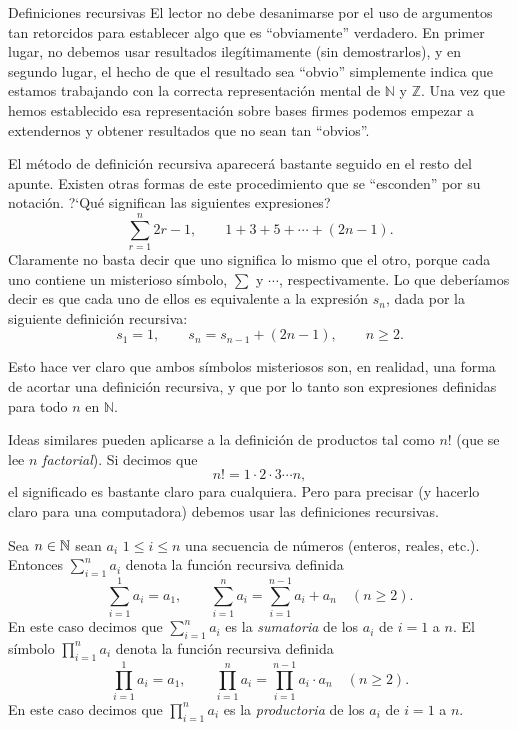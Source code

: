 \begin{section}{Definiciones recursivas}
El lector no debe desanimarse por el uso de argumentos tan
retorcidos para establecer algo que es ``obviamente'' verdadero.
En primer lugar, no debemos usar resultados ilegítimamente (sin
demostrarlos), y en segundo lugar, el hecho de que el resultado
sea ``obvio'' simplemente indica que estamos trabajando con la
correcta representación mental de $\mathbb N$ y $\mathbb Z$. Una
vez que hemos establecido esa representación sobre bases firmes
podemos empezar a extendernos y obtener resultados que no sean tan
``obvios''.

El método de definición recursiva aparecerá bastante seguido en el
resto del apunte. Existen otras formas de este procedimiento que se
``esconden'' por su notación. ?`Qué significan las siguientes
expresiones?
$$
\sum_{r=1}^{n} 2r-1,\qquad 1+3+5+\cdots +(2n-1).
$$
Claramente no basta decir que uno significa lo mismo que el otro,
porque cada uno contiene un misterioso símbolo, $\sum$ y $\cdots$,
respectivamente. Lo que deberíamos decir es que cada uno de ellos
es equivalente a la expresión $s_n$, dada por la siguiente
definición recursiva:
$$
s_1= 1, \qquad s_n = s_{n-1} +(2n-1), \qquad n\ge 2.
$$



Esto hace ver claro que ambos símbolos misteriosos son, en
realidad, una forma de acortar una definición recursiva, y que por
lo tanto son expresiones definidas para todo $n$ en $\mathbb N$.

Ideas similares pueden aplicarse a la definición de productos tal
como $n!$ (que se lee $n$ {\it factorial}). Si decimos que
$$
n!=1 \cdot 2 \cdot 3 \cdots n,
$$
el significado es bastante claro para cualquiera. Pero para
precisar (y hacerlo claro para una computadora) debemos usar las
definiciones recursivas.

\begin{definicion} Sea $n \in {\mathbb N}$ sean $a_i$  $1 \le i \le n$ una secuencia de números (enteros, reales, etc.). Entonces $\sum_{i=1}^{n} a_i$  denota la función recursiva definida  
	$$
	\sum_{i=1}^{1} a_i= a_1, \qquad \sum_{i=1}^{n} a_i = \sum_{i=1}^{n-1} a_i+ a_{n} \quad (n\ge 2).
	$$
	En  este caso  decimos que  $\sum_{i=1}^{n} a_i$ es la \textit{sumatoria} de los $a_i$ de $i=1$  a $n$. 
	El símbolo $\prod_{i=1}^{n} a_i$ denota la función recursiva definida  
	$$
	\prod_{i=1}^{1} a_i= a_1, \qquad \prod_{i=1}^{n} a_i = \prod_{i=1}^{n-1} a_i \cdot  a_{n} \quad (n\ge 2).
	$$
	En  este caso  decimos que  $\prod_{i=1}^{n} a_i$ es la \textit{productoria} de los $a_i$ de $i=1$  a $n$. 
\end{definicion}




\end{section}
